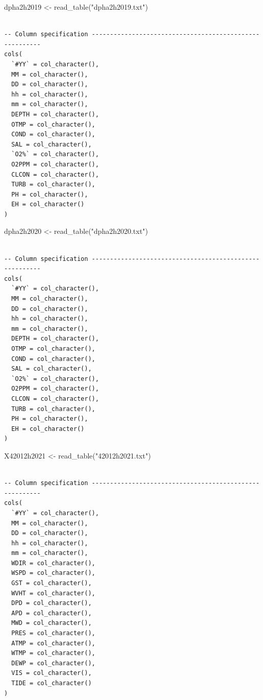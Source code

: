\documentclass[
  letterpaper,
  DIV=11,
  numbers=noendperiod]{scrreprt}
\newenvironment{Shaded}{\begin{snugshade}}{\end{snugshade}}
\newcommand{\FunctionTok}[1]{\textcolor[rgb]{0.28,0.35,0.67}{#1}}
\newcommand{\NormalTok}[1]{\textcolor[rgb]{0.00,0.23,0.31}{#1}}
\newcommand{\OtherTok}[1]{\textcolor[rgb]{0.00,0.23,0.31}{#1}}
\newcommand{\StringTok}[1]{\textcolor[rgb]{0.13,0.47,0.30}{#1}}
\begin{document}
\begin{Shaded}
\begin{Highlighting}[]
\NormalTok{dpha2h2019 }\OtherTok{\textless{}{-}} \FunctionTok{read\_table}\NormalTok{(}\StringTok{"dpha2h2019.txt"}\NormalTok{)}
\end{Highlighting}
\end{Shaded}

\begin{verbatim}

-- Column specification --------------------------------------------------------
cols(
  `#YY` = col_character(),
  MM = col_character(),
  DD = col_character(),
  hh = col_character(),
  mm = col_character(),
  DEPTH = col_character(),
  OTMP = col_character(),
  COND = col_character(),
  SAL = col_character(),
  `O2%` = col_character(),
  O2PPM = col_character(),
  CLCON = col_character(),
  TURB = col_character(),
  PH = col_character(),
  EH = col_character()
)
\end{verbatim}

\begin{Shaded}
\begin{Highlighting}[]
\NormalTok{dpha2h2020 }\OtherTok{\textless{}{-}} \FunctionTok{read\_table}\NormalTok{(}\StringTok{"dpha2h2020.txt"}\NormalTok{)}
\end{Highlighting}
\end{Shaded}

\begin{verbatim}

-- Column specification --------------------------------------------------------
cols(
  `#YY` = col_character(),
  MM = col_character(),
  DD = col_character(),
  hh = col_character(),
  mm = col_character(),
  DEPTH = col_character(),
  OTMP = col_character(),
  COND = col_character(),
  SAL = col_character(),
  `O2%` = col_character(),
  O2PPM = col_character(),
  CLCON = col_character(),
  TURB = col_character(),
  PH = col_character(),
  EH = col_character()
)
\end{verbatim}

\begin{Shaded}
\begin{Highlighting}[]
\NormalTok{X42012h2021 }\OtherTok{\textless{}{-}} \FunctionTok{read\_table}\NormalTok{(}\StringTok{"42012h2021.txt"}\NormalTok{)}
\end{Highlighting}
\end{Shaded}

\begin{verbatim}

-- Column specification --------------------------------------------------------
cols(
  `#YY` = col_character(),
  MM = col_character(),
  DD = col_character(),
  hh = col_character(),
  mm = col_character(),
  WDIR = col_character(),
  WSPD = col_character(),
  GST = col_character(),
  WVHT = col_character(),
  DPD = col_character(),
  APD = col_character(),
  MWD = col_character(),
  PRES = col_character(),
  ATMP = col_character(),
  WTMP = col_character(),
  DEWP = col_character(),
  VIS = col_character(),
  TIDE = col_character()
)
\end{verbatim}
\end{document}
